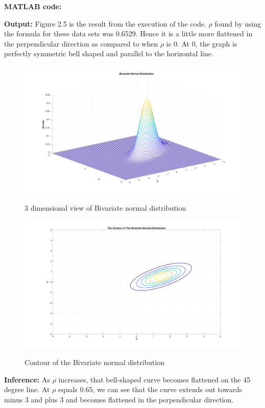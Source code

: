  \noindent \textbf{MATLAB code:}


 \noindent \textbf{Output:}
 \noindent Figure 2.5 is the result from the execution of the code. $\rho$ found by using the formula for these data sets was 0.6529. Hence it is a little more flattened in the perpendicular direction as compared to when $\rho$ is 0. At 0, the graph is perfectly symmetric bell shaped and parallel to the horizontal line.
\begin{figure}[H]
\centering
{\includegraphics[scale=0.13]{ass5_1.png}}
\caption{3 dimensional view of Bivariate normal distribution}
\label{3 dimensional view of Bivariate normal distribution}
\end{figure}

\begin{figure}[H]
\centering
{\includegraphics[scale=0.13]{ass5_2.png}}
\caption{Contour of the Bivariate normal distribution}
\label{Contour of the Bivariate normal distribution}
\end{figure}

\noindent \textbf{Inference:} As $\rho$ increases, that bell-shaped curve becomes flattened on the 45 degree line. At $\rho$ equals 0.65, we can see that the curve extends out towards minus 3 and plus 3 and becomes flattened in the perpendicular direction.
